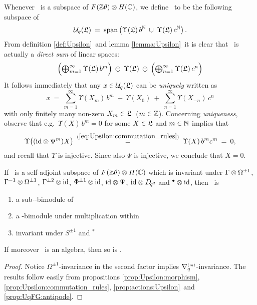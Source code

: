 Whenever \calL\ is a subspace of $F(\mathbb{Z} \theta) \otimes H(\mathbb{C})$, we define \UqT\ to be
the following subspace of \Uqext
\begin{equation}\label{eq:def:UqT}
 \UqT \:=\: \mbox{span} \left(\vertM
              \Upsilon(\calL)\, b^\NN  \:\cup\:
              \Upsilon(\calL)\, c^\NN \right).
\end{equation}
From definition \ref{def:Upsilon}\ and lemma \ref{lemma:Upsilon}\
it is clear that \UqT\ is actually a {\em direct sum\/} of linear spaces:
\begin{equation}\label{eq:UqFG:direct_sum}
 \textstyle \left( \bigoplus_{m=1}^\infty  \Upsilon(\calL)\,b^m  \vertL\right)
                  \: \oplus \:    \Upsilon(\calL)   \: \oplus \:
       \left( \bigoplus_{n=1}^\infty  \Upsilon(\calL)\,c^n \vertL\right)
\end{equation}
It follows immediately that any $x\in {\mathcal U}_q\!\left(\mathfrak{L}\right)$ can be {\em uniquely\/} written as
$$  x \:=\: \sum_{m=1}^\infty \Upsilon(X_m)\, b^m \:+\:
           \Upsilon(X_0) \:+\;
         \sum_{n=1}^\infty \Upsilon(X_{-n})\, c^n    $$
with only finitely many non-zero $X_m \in \mathfrak{L}\;$ ($m\in \mathbb{Z}$).
Concerning {\em uniqueness}, observe that e.g.\ $\Upsilon(X)\, b^m = 0$
for some $X \in \mathfrak{L}$ and $m\in\mathbb{N}$ implies that
$$  \Upsilon\!\left(\vertM(\id \tens \Psi^m)X \right)
          \: \stackrel{(\ref{eq:Upsilon:commutation_rules})}{=} \:
    \Upsilon(X)\,b^m c^m \:=\: 0,  $$
and recall that $\Upsilon$ is injective. Since also $\Psi$ is injective,
we conclude that $X=0$.


\begin{prop} \label{prop:UqFG}
If\/ \calL\ is a self-adjoint subspace of\/ $F(\mathbb{Z} \theta) \otimes H(\mathbb{C})$ which is
invariant under\/
$\Gamma \otimes \Omega^{\pm 1}$,
$\Gamma^{-1} \otimes \Omega^{\pm 1}$,
$\Gamma^{\pm 2} \otimes \mbox{\rm id}$,
$\Phi^{\pm 1} \otimes \mbox{\rm id}$,
$\mbox{\rm id} \otimes \Psi$,
$\mbox{\rm id} \otimes D_{\!q^2}$
and\/ $^\bullet \otimes \mbox{\rm id}$, then\/ \UqT\ is
\begin{enumerate}
   \item a sub-\Aq-bimodule of\/ \Uqext
   \item a\/ \Uq-bimodule under multiplication within\/ \Uqext
   \item invariant under\/ $S^{\pm 1}$ and $^*$
\end{enumerate}
If moreover\/ \calL\ is an algebra, then so is\/ \UqT.
\end{prop}

\begin{proof}
  Notice $\Omega^{\pm 1}$-invariance in the second factor implies
  \mbox{$\nabla_q^{\scriptscriptstyle (m)}$-invariance}\@.
  The results follow easily from propositions
  \ref{prop:Upsilon:morphism},
  \ref{prop:Upsilon:commutation_rules},
  \ref{prop:actions:Upsilon}\ and
  \ref{prop:UqFG:antipode}\@.
\end{proof}


